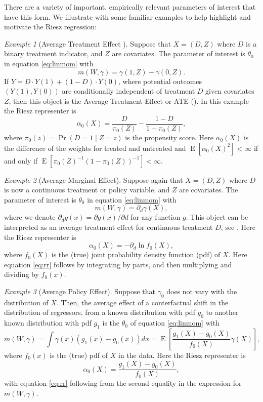 \documentclass[aos]{imsart}
\numberwithin{equation}{section}
\theoremstyle{plain}
\theoremstyle{remark}
\newtheorem{example}{Example}
\DeclareMathOperator{\E}{E}
\begin{document}
There are a variety of important, empirically relevant parameters of interest that have this form. 
We illustrate with some familiar examples to help highlight and motivate the Riesz regression: 

\begin{example}[Average Treatment Effect \label{ex:ate}] Suppose that $X=(D,Z)$ where $D$ is a binary treatment indicator, and $Z$ are covariates. The parameter of interest is $\theta_0$ in equation \eqref{eq:linmom} with 
\[m(W,\gamma)=\gamma(1,Z)-\gamma(0,Z).\]
If $Y = D \cdot Y(1) + (1 - D) \cdot Y(0)$, where potential outcomes $(Y(1), Y(0))$ are conditionally independent of treatment $D$ given covariates $Z$, then this object is the Average Treatment Effect or ATE (\cite{rosenbaum1983central}). In this example the Riesz representer is 
\[ \alpha_0(X) =  \frac{D}{\pi_0(Z)} - \frac{1-D}{1-\pi_0(Z)},\] where $\pi_0(z) = \Pr(D = 1 \mid Z = z)$ is the propensity score. Here $\alpha_0(X)$ is the difference of the \cite{horvitz1952generalization} weights for treated and untreated and  $\E[\alpha_0(X)^2] < \infty$ if and only if $\E[\pi_0(Z)^{-1}(1-\pi_0(Z))^{-1}] < \infty$.
\end{example}

\begin{example}[Average Marginal Effect] \label{ex:deriv} Suppose again that $X=(D,Z)$ where $D$ is now a continuous treatment or policy variable, and $Z$ are covariates. The parameter of interest is $\theta_0$ in equation \eqref{eq:linmom} with
\[m(W,\gamma) = \partial_d \gamma(X) ,\]
where we denote $\partial_d g(x) = \partial g(x) / \partial d$ for any function $g$. This object can be interpreted as an average treatment effect for continuous treatment $D$, see \cite{imbens2009identification}. Here the Riesz representer is
\[\alpha_0(X)=-\partial_d \ln f_0(X), \]  where $f_0(X)$ is the (true) joint probability density function (pdf) of $X$. Here equation \eqref{eq:rr} follows by integrating by parts, and then multiplying and dividing by $f_0(x)$. 
\end{example}

\begin{example}[Average Policy Effect] Suppose that $\gamma_0$ does not vary with the distribution of $X$. Then, the average effect of a conterfactual shift in the distribution of regressors, from a known distribution with pdf $g_0$ to another known distribution with pdf $g_1$ is the $\theta_0$ of equation \eqref{eq:linmom} with 
\[m(W,\gamma) = \int \gamma(x) (g_1(x) - g_0(x)) dx = \E\left[\frac{g_1(X) - g_0(X)}{f_0(X)} \gamma(X)\right],\] where $f_0(x)$ is the (true) pdf of $X$ in the data. 
Here the Riesz representer is
\[\alpha_0(X)= \frac{g_1(X) - g_0(X)}{f_0(X)}, \]  
with equation \eqref{eq:rr} following from the second equality in the expression for $m(W,\gamma)$.
\end{example}
\end{document}
